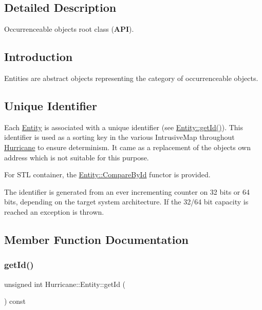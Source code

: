 \subsection{Detailed Description}
Occurrenceable objects root class ({\bfseries A\+PI}). 

\hypertarget{classHurricane_1_1Entity_secEntityIntro}{}\subsection{Introduction}\label{classHurricane_1_1Entity_secEntityIntro}
Entities are abstract objects representing the category of occurrenceable objects.\hypertarget{classHurricane_1_1Entity_secEntityId}{}\subsection{Unique Identifier}\label{classHurricane_1_1Entity_secEntityId}
Each \mbox{\hyperlink{classHurricane_1_1Entity}{Entity}} is associated with a unique identifier (see \mbox{\hyperlink{classHurricane_1_1Entity_aaff727ad7411392d4a991a56e2579a60}{Entity\+::get\+Id()}}). This identifier is used as a sorting key in the various Intrusive\+Map throughout \mbox{\hyperlink{namespaceHurricane}{Hurricane}} to ensure determinism. It came as a replacement of the object\textquotesingle{}s own address which is not suitable for this purpose.

For S\+TL container, the \mbox{\hyperlink{structHurricane_1_1Entity_1_1CompareById}{Entity\+::\+Compare\+By\+Id}} functor is provided.

The identifier is generated from an ever incrementing counter on 32 bits or 64 bits, depending on the target system architecture. If the 32/64 bit capacity is reached an exception is thrown. 

\subsection{Member Function Documentation}
\mbox{\label{classHurricane_1_1Entity_aaff727ad7411392d4a991a56e2579a60}} 
\subsubsection{\texorpdfstring{get\+Id()}{getId()}}
{\footnotesize\ttfamily unsigned int Hurricane\+::\+Entity\+::get\+Id (\begin{DoxyParamCaption}{ }\end{DoxyParamCaption}) const\hspace{0.3cm}{\ttfamily [inline]}}

